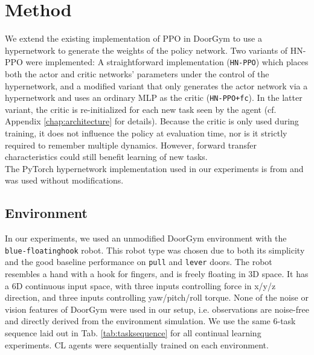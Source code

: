 \documentclass[dvipsnames]{article} %
\newcommand{\comment}[1]{}
\newcommand{\sa}[1] {\comment{{\color{cyan} SA: #1}}}                %
\newcommand{\as}[1] {\comment{{\color{orange} AS: #1}}}              %
\begin{document}
\section{Method}
We extend the existing implementation of PPO in DoorGym to use a hypernetwork to generate the weights of the policy network. Two variants of HN-PPO were implemented: A straightforward implementation (\texttt{HN-PPO}) which places both the actor and critic networks' parameters under the control of the hypernetwork, and a modified variant that only generates the actor network via a hypernetwork and uses an ordinary MLP as the critic (\texttt{HN-PPO+fc}). In the latter variant, the critic is re-initialized for each new task seen by the agent (cf. Appendix \ref{chap:architecture} for details). Because the critic is only used during training, it does not influence the policy at evaluation time, nor is it strictly required to remember multiple dynamics. However, forward transfer characteristics could still benefit learning of new tasks.\\
The PyTorch hypernetwork implementation used in our experiments is from \cite{auddyHollensteinClfd} and was used without modifications. 

\subsection{Environment \as{I think what you wrote about DoorGym should go here, otherwise it is way too many places.}}
\sa{Add a subsection for the RL environment and describe here the details of the RL setup and tasks, including any modifications that you made to the default door-gym and the reasons for such modifications. This needs to be connected to the content about door-gym in the background section. So, in the background, you can describe the default door-gym environment and in this section you can describe your specific tasks and modifications.}
In our experiments, we used an unmodified DoorGym \cite{doorgym} environment with the \texttt{blue-floatinghook} robot. This robot type was chosen due to both its simplicity and the good baseline performance on \texttt{pull} and \texttt{lever} doors. The robot resembles a hand with a hook for fingers, and is freely floating in 3D space. It has a 6D continuous input space, with three inputs controlling force in x/y/z direction, and three inputs controlling yaw/pitch/roll torque. None of the noise or vision features of DoorGym were used in our setup, i.e. observations are noise-free and directly derived from the environment simulation. We use the same 6-task sequence laid out in Tab. \ref{tab:tasksequence} for all continual learning experiments. CL agents were sequentially trained on each environment. %
\sa{Some example images would be nice to have.}
\end{document}
